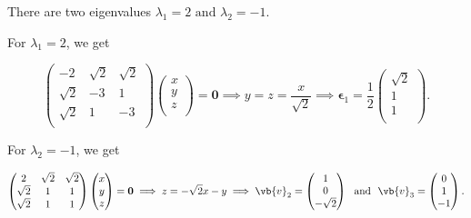 \documentclass[a4paper,12pt]{report}
\begin{document}
{There are two eigenvalues \(\lambda _{1} = 2 \text { and } \lambda _{2} =-1 \).  

For \(\lambda _{1} =2\), we get

\begin{equation}
\begin{pmatrix}
    -2 & \sqrt{2}  & \sqrt{2}   \\
    \sqrt{2}  & -3 & 1  \\
    \sqrt{2}  & 1 & -3  \\
\end{pmatrix} \begin{pmatrix}
     x \\
     y \\
     z \\
\end{pmatrix} = \boldsymbol{0} \implies y = z = \frac{x}{\sqrt{2} } \implies \boldsymbol{\epsilon }_{1} = \frac{1}{2} \begin{pmatrix}
     \sqrt{2}  \\
     1 \\
     1 \\
\end{pmatrix}. 
\end{equation}

For \(\lambda _{2} =-1 \), we get 

\begin{equation}
    \begin{pmatrix}
        2 & \sqrt{2}  & \sqrt{2}   \\
        \sqrt{2}  & 1 & 1\\
        \sqrt{2}  & 1 & 1  \\
    \end{pmatrix}\begin{pmatrix}
         x \\
         y \\
         z \\
    \end{pmatrix} = \boldsymbol{0} \implies z = -\sqrt{2}x - y \implies \vb{v} _{2} = \begin{pmatrix}
         1 \\
         0 \\
         -\sqrt{2}  \\
    \end{pmatrix} ~\text { and }~ \vb{v} _{3} = \begin{pmatrix}
         0 \\
         1 \\
         -1 \\
    \end{pmatrix}.  
\end{equation}

}
\end{document}
